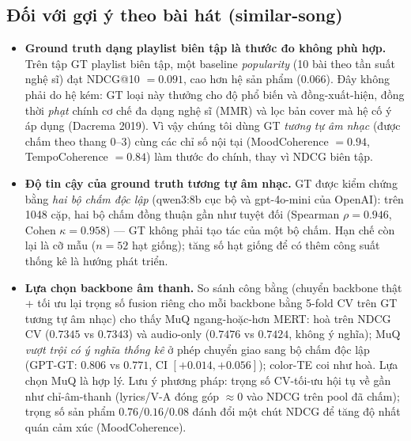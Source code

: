 \subsection{Đối với gợi ý theo bài hát (similar-song)}
\begin{itemize}
  \item \textbf{Ground truth dạng playlist biên tập là thước đo không phù hợp.}
        Trên tập GT playlist biên tập, một baseline \emph{popularity} (10 bài theo
        tần suất nghệ sĩ) đạt NDCG@10 $=0.091$, cao hơn hệ sản phẩm ($0.066$). Đây
        không phải do hệ kém: GT loại này thưởng cho độ phổ biến và đồng-xuất-hiện,
        đồng thời \emph{phạt} chính cơ chế đa dạng nghệ sĩ (MMR) và lọc bản cover mà
        hệ cố ý áp dụng (Dacrema 2019). Vì vậy chúng tôi dùng GT \emph{tương tự âm
        nhạc} (được chấm theo thang 0--3) cùng các chỉ số nội tại (MoodCoherence
        $=0.94$, TempoCoherence $=0.84$) làm thước đo chính, thay vì NDCG biên tập.
  \item \textbf{Độ tin cậy của ground truth tương tự âm nhạc.} GT được kiểm chứng
        bằng \emph{hai bộ chấm độc lập} (qwen3:8b cục bộ và gpt-4o-mini của OpenAI):
        trên 1048 cặp, hai bộ chấm đồng thuận gần như tuyệt đối (Spearman
        $\rho = 0.946$, Cohen $\kappa = 0.958$) --- GT không phải tạo tác của một bộ
        chấm. Hạn chế còn lại là cỡ mẫu ($n=52$ hạt giống); tăng số hạt giống để có
        thêm công suất thống kê là hướng phát triển.
  \item \textbf{Lựa chọn backbone âm thanh.} So sánh công bằng (chuyển backbone
        thật + tối ưu lại trọng số fusion riêng cho mỗi backbone bằng 5-fold CV trên
        GT tương tự âm nhạc) cho thấy MuQ ngang-hoặc-hơn MERT: hoà trên NDCG CV
        ($0.7345$ vs $0.7343$) và audio-only ($0.7476$ vs $0.7424$, không ý nghĩa);
        MuQ \emph{vượt trội có ý nghĩa thống kê} ở phép chuyển giao sang bộ chấm độc
        lập (GPT-GT: $0.806$ vs $0.771$, CI $[+0.014, +0.056]$); color-TE coi như
        hoà. Lựa chọn MuQ là hợp lý. Lưu ý phương pháp: trọng số CV-tối-ưu hội tụ về
        gần như chỉ-âm-thanh (lyrics/V-A đóng góp $\approx 0$ vào NDCG trên pool đã
        chấm); trọng số sản phẩm $0.76/0.16/0.08$ đánh đổi một chút NDCG để tăng độ
        nhất quán cảm xúc (MoodCoherence).
\end{itemize}


